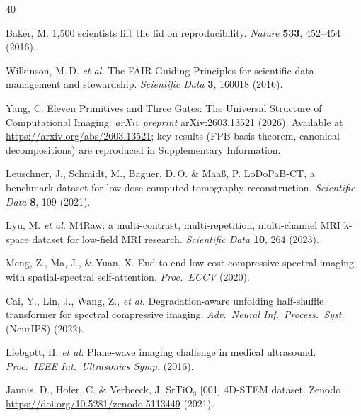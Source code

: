 \documentclass[11pt,a4paper]{article}
\begin{document}
\begingroup
\renewcommand{\section}[2]{}
\begin{thebibliography}{40}

Baker, M.
1,500 scientists lift the lid on reproducibility.
\textit{Nature} \textbf{533}, 452--454 (2016).

Wilkinson, M.\,D. \textit{et al.}
The FAIR Guiding Principles for scientific data management and stewardship.
\textit{Scientific Data} \textbf{3}, 160018 (2016).

Yang, C.
Eleven Primitives and Three Gates: The Universal Structure of Computational Imaging.
\textit{arXiv preprint} arXiv:2603.13521 (2026).
Available at \url{https://arxiv.org/abs/2603.13521}; key results (FPB basis theorem, canonical decompositions) are reproduced in Supplementary Information.

Leuschner, J., Schmidt, M., Baguer, D.\,O. \& Maa{\ss}, P.
LoDoPaB-CT, a benchmark dataset for low-dose computed tomography reconstruction.
\textit{Scientific Data} \textbf{8}, 109 (2021).

Lyu, M. \textit{et al.}
M4Raw: a multi-contrast, multi-repetition, multi-channel MRI k-space dataset for low-field MRI research.
\textit{Scientific Data} \textbf{10}, 264 (2023).

Meng, Z., Ma, J., \& Yuan, X.
End-to-end low cost compressive spectral imaging with spatial-spectral self-attention.
\textit{Proc.\ ECCV} (2020).

Cai, Y., Lin, J., Wang, Z., \textit{et al.}
Degradation-aware unfolding half-shuffle transformer for spectral compressive imaging.
\textit{Adv.\ Neural Inf.\ Process.\ Syst.} (NeurIPS) (2022).

Liebgott, H. \textit{et al.}
Plane-wave imaging challenge in medical ultrasound.
\textit{Proc.\ IEEE Int.\ Ultrasonics Symp.} (2016).

Jannis, D., Hofer, C. \& Verbeeck, J.
SrTiO$_3$ [001] 4D-STEM dataset.
Zenodo \url{https://doi.org/10.5281/zenodo.5113449} (2021).


\end{thebibliography}
\end{document}

